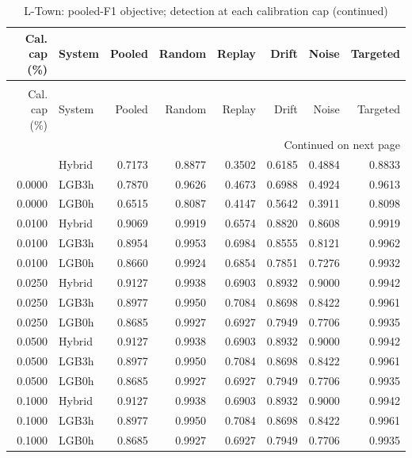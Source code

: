 \begingroup
\small
\setlength{\tabcolsep}{4pt}
\renewcommand{\arraystretch}{1.1}
\begin{longtable}{@{}rlrrrrrr@{}}
\caption{L-Town: pooled-F1 objective; detection at each calibration cap}\label{tab:selected_ltown_pooled_detection-supp20261008}\\
\toprule
\shortstack{Cal. cap\\(\%)} & System & Pooled & Random & Replay & Drift & Noise & Targeted \\
\midrule
\endfirsthead
\caption[]{L-Town: pooled-F1 objective; detection at each calibration cap (continued)}\\
\toprule
\shortstack{Cal. cap\\(\%)} & System & Pooled & Random & Replay & Drift & Noise & Targeted \\
\midrule
\endhead
\midrule
\multicolumn{8}{r}{Continued on next page}\\
\endfoot
\bottomrule
\endlastfoot
0.0000 & Hybrid & 0.7173 & 0.8877 & 0.3502 & 0.6185 & 0.4884 & 0.8833 \\*
0.0000 & LGB3h & 0.7870 & 0.9626 & 0.4673 & 0.6988 & 0.4924 & 0.9613 \\*
0.0000 & LGB0h & 0.6515 & 0.8087 & 0.4147 & 0.5642 & 0.3911 & 0.8098 \\
0.0100 & Hybrid & 0.9069 & 0.9919 & 0.6574 & 0.8820 & 0.8608 & 0.9919 \\*
0.0100 & LGB3h & 0.8954 & 0.9953 & 0.6984 & 0.8555 & 0.8121 & 0.9962 \\*
0.0100 & LGB0h & 0.8660 & 0.9924 & 0.6854 & 0.7851 & 0.7276 & 0.9932 \\
0.0250 & Hybrid & 0.9127 & 0.9938 & 0.6903 & 0.8932 & 0.9000 & 0.9942 \\*
0.0250 & LGB3h & 0.8977 & 0.9950 & 0.7084 & 0.8698 & 0.8422 & 0.9961 \\*
0.0250 & LGB0h & 0.8685 & 0.9927 & 0.6927 & 0.7949 & 0.7706 & 0.9935 \\
0.0500 & Hybrid & 0.9127 & 0.9938 & 0.6903 & 0.8932 & 0.9000 & 0.9942 \\*
0.0500 & LGB3h & 0.8977 & 0.9950 & 0.7084 & 0.8698 & 0.8422 & 0.9961 \\*
0.0500 & LGB0h & 0.8685 & 0.9927 & 0.6927 & 0.7949 & 0.7706 & 0.9935 \\
0.1000 & Hybrid & 0.9127 & 0.9938 & 0.6903 & 0.8932 & 0.9000 & 0.9942 \\*
0.1000 & LGB3h & 0.8977 & 0.9950 & 0.7084 & 0.8698 & 0.8422 & 0.9961 \\*
0.1000 & LGB0h & 0.8685 & 0.9927 & 0.6927 & 0.7949 & 0.7706 & 0.9935 \\

\end{longtable}
